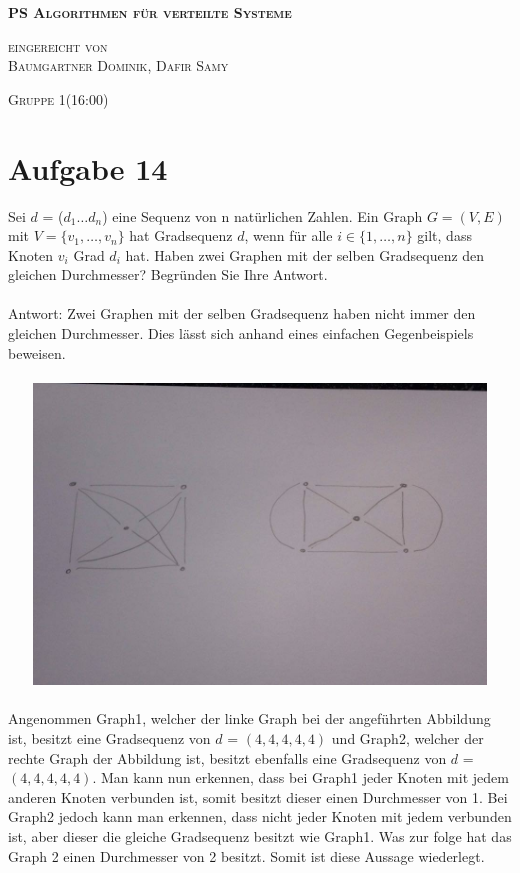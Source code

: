 \documentclass[12pt,a4paper]{report}
\begin{document}
\begin{titlepage}
	\begin{center}

		\vspace*{1.0cm}
		\huge
		\textsc{\bf{PS Algorithmen für verteilte Systeme}}

		\vspace*{4.0cm}
		\textsc{
			\normalsize{eingereicht von} \\[0.5\baselineskip]
			{\large Baumgartner Dominik, Dafir Samy}
		}

		\vspace*{3.0cm}
		\textsc{
			\normalsize{Gruppe  1(16:00)}
		}

	\end{center}
\end{titlepage}

\section*{Aufgabe 14}
Sei $d$ = ($d_1\dots d_n$) eine Sequenz von n natürlichen Zahlen. Ein Graph $G = (V, E)$ mit $V = \{v_1,\dots, v_n\}$ hat Gradsequenz $d$, wenn für alle $i \in \{1,\dots, n\}$ gilt, dass Knoten $v_i$ Grad $d_i$ hat. Haben zwei Graphen mit der selben Gradsequenz den gleichen Durchmesser? Begründen Sie Ihre Antwort.
\\
\\
Antwort: Zwei Graphen mit der selben Gradsequenz haben nicht immer den gleichen Durchmesser. Dies lässt sich anhand eines einfachen Gegenbeispiels beweisen.\\
\\
\includegraphics[height=8cm, width=15cm]{gegenbsp.jpg}
\\
\\
Angenommen Graph1, welcher der linke Graph bei der angeführten Abbildung ist, besitzt eine Gradsequenz von $d$ = $(4,4,4,4,4)$ und Graph2, welcher der rechte Graph der Abbildung ist, besitzt ebenfalls eine Gradsequenz von $d$ = $(4,4,4,4,4)$. Man kann nun erkennen, dass bei Graph1 jeder Knoten mit jedem anderen Knoten verbunden ist, somit besitzt dieser einen Durchmesser von 1. Bei Graph2 jedoch kann man erkennen, dass nicht jeder Knoten mit jedem verbunden ist, aber dieser die gleiche Gradsequenz besitzt wie Graph1. Was zur folge hat das Graph 2 einen Durchmesser von 2 besitzt. Somit ist diese Aussage wiederlegt.
\end{document}
